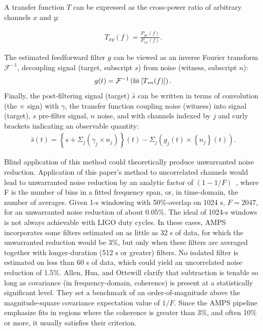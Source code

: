 A transfer function $T$ can be expressed as the cross-power ratio of arbitrary channels $x$ and $y$:

            \begin{eqnarray}
            T_{xy} (f) = \frac{P_{yx}(f)}{P_{xx}(f)}. \label{Txy}
            \end{eqnarray}

\noindent The estimated feedforward filter $g$ can be viewed as an inverse Fourier transform $\mathcal{F}^{-1}$, decoupling signal (target, subscript $s$) from noise (witness, subscript $n$):
            \begin{eqnarray}
            g(t) = \mathcal{F}^{-1} \left( \textup{fit} \left[ T_{sn} (f) \right] \right) \label{gcf}.
            \end{eqnarray}
\noindent Finally, the post-filtering signal (target) $\hat{s}$ can be written in terms of convolution (the $\times$ sign) with $\gamma$, the transfer function coupling noise (witness) into signal (target), $s$ pre-filter signal, $n$ noise, and with channels indexed by $j$ and curly brackets indicating an observable quantity: 
            \begin{eqnarray}
            \hat{s} (t) = \left\{ s + \Sigma_j \left(\gamma_j \times n_j\right)\right\} (t) - \Sigma_j \left(g_{j} (t) \times \left\{ n_{j} \right\} (t)\right) \label{hatsf}.
            \end{eqnarray}


Blind application of this method could theoretically produce unwarranted noise reduction. Application of this paper's method to uncorrelated channels would lead to unwarranted noise reduction by an analytic factor of $(1 - 1/F)$~\cite{AllenHuaOttewill1999}, where F is the number of bins in a fitted frequency span, or, in time-domain, the number of averages. Given 1-s windowing with 50\%-overlap on 1024 s, $F = 2047$, for an unwarranted noise reduction of about 0.05\%. The ideal of 1024-s windows is not always achievable with LIGO duty cycles. In these cases, AMPS incorporates some filters estimated on as little as 32 s of data, for which the unwarranted reduction would be 3\%, but only when these filters are averaged together with longer-duration (512 s or greater) filters. No isolated filter is estimated on less than 60 s of data, which could yield an uncorrelated noise reduction of 1.5\%. Allen, Hua, and Ottewill clarify that subtraction is tenable so long as covariance (in frequency-domain, coherence) is present at a statistically significant level. They set a benchmark of an order-of-magnitude above the magnitude-square covariance expectation value of $1/F$. Since the AMPS pipeline emphasize fits in regions where the coherence is greater than 3\%, and often 10\% or more, it usually satisfies their criterion.



